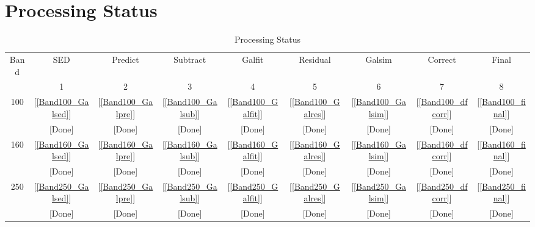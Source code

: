 \documentclass[11pt,a4paper]{article}
\begin{document}

\clearpage

\section{Processing Status}
\label{ProcessingStatus}

\begin{table}[h]
	\caption{Processing Status}
	\begin{tabular}{ccccccccc}
		\hline
		\hline
		Band & SED & Predict & Subtract & Galfit & Residual & Galsim & Correct & Final \\
		& 1 & 2 & 3 & 4 & 5 & 6 & 7 & 8 \\
		\hline
		100 & [\ref{Band100_Galsed}] & [\ref{Band100_Galpre}] & [\ref{Band100_Galsub}] & [\ref{Band100_Galfit}] & [\ref{Band100_Galres}] & [\ref{Band100_Galsim}] & [\ref{Band100_dfcorr}] & [\ref{Band100_final}] \\
		& \textcolor{green!50!black}{[Done]} & \textcolor{green!50!black}{[Done]} & \textcolor{green!50!black}{[Done]} & \textcolor{green!50!black}{[Done]} & \textcolor{green!50!black}{[Done]} & \textcolor{green!50!black}{[Done]} & \textcolor{green!50!black}{[Done]} & \textcolor{green!50!black}{[Done]} \\
		160 & [\ref{Band160_Galsed}] & [\ref{Band160_Galpre}] & [\ref{Band160_Galsub}] & [\ref{Band160_Galfit}] & [\ref{Band160_Galres}] & [\ref{Band160_Galsim}] & [\ref{Band160_dfcorr}] & [\ref{Band160_final}] \\
		& \textcolor{green!50!black}{[Done]} & \textcolor{green!50!black}{[Done]} & \textcolor{green!50!black}{[Done]} & \textcolor{green!50!black}{[Done]} & \textcolor{green!50!black}{[Done]} & \textcolor{green!50!black}{[Done]} & \textcolor{green!50!black}{[Done]} & \textcolor{green!50!black}{[Done]} \\
		250 & [\ref{Band250_Galsed}] & [\ref{Band250_Galpre}] & [\ref{Band250_Galsub}] & [\ref{Band250_Galfit}] & [\ref{Band250_Galres}] & [\ref{Band250_Galsim}] & [\ref{Band250_dfcorr}] & [\ref{Band250_final}] \\
		& \textcolor{green!50!black}{[Done]} & \textcolor{green!50!black}{[Done]} & \textcolor{green!50!black}{[Done]} & \textcolor{green!50!black}{[Done]} & \textcolor{green!50!black}{[Done]} & \textcolor{green!50!black}{[Done]} & \textcolor{green!50!black}{[Done]} & \textcolor{green!50!black}{[Done]} \\

\end{tabular}
\end{table}
\end{document}
